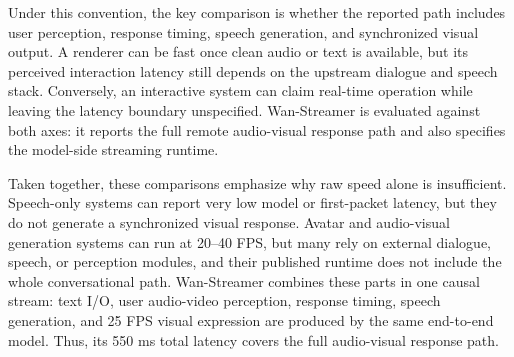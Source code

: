 \documentclass[]{style/style}
\newcommand{\model}{Wan-Streamer\xspace}
\begin{document}
Under this convention, the key comparison is whether the reported path includes user perception, response timing, speech generation, and synchronized visual output. A renderer can be fast once clean audio or text is available, but its perceived interaction latency still depends on the upstream dialogue and speech stack. Conversely, an interactive system can claim real-time operation while leaving the latency boundary unspecified. \model is evaluated against both axes: it reports the full remote audio-visual response path and also specifies the model-side streaming runtime.

Taken together, these comparisons emphasize why raw speed alone is insufficient. Speech-only systems can report very low model or first-packet latency, but they do not generate a synchronized visual response. Avatar and audio-visual generation systems can run at 20--40 FPS, but many rely on external dialogue, speech, or perception modules, and their published runtime does not include the whole conversational path. \model combines these parts in one causal stream: text I/O, user audio-video perception, response timing, speech generation, and 25 FPS visual expression are produced by the same end-to-end model. Thus, its 550 ms total latency covers the full audio-visual response path.
\end{document}
